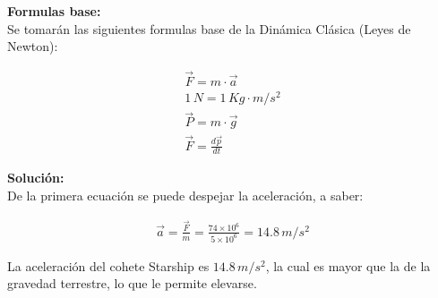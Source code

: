 \documentclass[11pt,letterpaper]{article}
\begin{document}
\textbf{Formulas base:}\\

Se tomarán las siguientes formulas base de la Dinámica Clásica (Leyes de Newton):

\begin{align}
\boxed{ \vec{F} = m \cdot \vec{a} }\\
\boxed{ 1\,N = 1\,Kg \cdot m/s^2}\\
\boxed{ \vec{P} = m \cdot \vec{g} }\\
\boxed{ \vec{F} = \frac{d\vec{p}}{dt} }
\end{align}

\textbf{Solución:}\\

De la primera ecuación se puede despejar la aceleración, a saber:

\begin{align}
\vec{a} = \frac{\vec{F}}{m} = \frac{74 \times 10^6}{5 \times 10^6} = 14.8\,m/s^2
\end{align}

La aceleración del cohete Starship es $14.8\,m/s^2$, la cual es mayor que la de la gravedad terrestre, lo que le permite elevarse.

\end{document}
